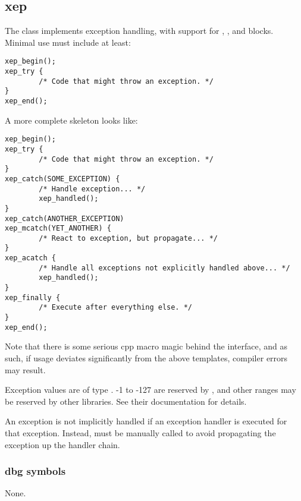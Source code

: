 %
%
%
%
%              

\subsection{xep}
\label{xep}
The  class implements exception handling, with support for
, , and  blocks.
Minimal use must include at least:
\begin{verbatim}
xep_begin();
xep_try {
        /* Code that might throw an exception. */
}
xep_end();
\end{verbatim}

A more complete skeleton looks like:
\begin{verbatim}
xep_begin();
xep_try {
        /* Code that might throw an exception. */
}
xep_catch(SOME_EXCEPTION) {
        /* Handle exception... */
        xep_handled();
}
xep_catch(ANOTHER_EXCEPTION)
xep_mcatch(YET_ANOTHER) {
        /* React to exception, but propagate... */
}
xep_acatch {
        /* Handle all exceptions not explicitly handled above... */
        xep_handled();
}
xep_finally {
        /* Execute after everything else. */
}
xep_end();
\end{verbatim}

Note that there is some serious cpp macro magic behind the 
interface, and as such, if usage deviates significantly from the above
templates, compiler errors may result.

Exception values are of type .  -1 to -127 are reserved by
, and other ranges may be reserved by other libraries.  See
their documentation for details.

An exception is not implicitly handled if an exception handler is executed for
that exception.  Instead,  must be manually called to
avoid propagating the exception up the handler chain.

\subsubsection{dbg symbols}
None.

